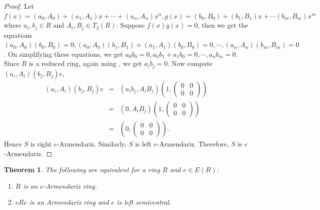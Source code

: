 \documentclass[12pt]{amsart}
\theoremstyle{plain}
\newtheorem{theorem}{Theorem}[section]
\theoremstyle{definition}
\theoremstyle{remark}
\numberwithin{equation}{section}
\begin{document}
\begin{proof}
	Let $f(x)=(a_0,A_0)+(a_1,A_1)x+\cdots+(a_n,A_n)x^n,g(x)=(b_0,B_0)+(b_1,B_1)x+\cdots(b_m,B_m)x^m$ where $a_i,b_j\in R$ and $A_i,B_j\in T_2(R)$. Suppose $f(x)g(x)=0$, then we get the equations $(a_0,A_0)(b_0,B_0)=0, (a_0,A_0)(b_1,B_1)+(a_1,A_1)(b_0,B_0)=0,\cdots,(a_n,A_n)(b_m,B_m)=0$. On simplifying these equations, we get $a_0b_0=0,a_0b_1+a_1b_0=0,\cdots,a_nb_m=0$. Since $R$ is a reduced ring, again using \cite[Lemma 1]{Armendariz}, we get $a_ib_j=0$. Now compute $(a_i,A_i)(b_j,B_j)e$,
	\begin{eqnarray*}
		(a_i,A_i)(b_j,B_j)e&=&(a_ib_j,A_iB_j)\left(1,\begin{pmatrix}
			0&0\\0&0
		\end{pmatrix}\right)\\
		&=&(0,A_iB_j)\left(1,\begin{pmatrix}
			0&0\\0&0
		\end{pmatrix}\right)\\
		&=&\left(0,\begin{pmatrix}
			0&0\\0&0
		\end{pmatrix}\right).
	\end{eqnarray*}
	Hence $S$ is right $e$-Armendariz. Similarly, $S$ is left $e$-Armendariz. Therefore, $S$ is $e$-Armendariz.
\end{proof}
\begin{theorem}
	The following are equivalent for a ring $R$ and $e\in E(R)$:
	\begin{enumerate}
		\item $R$ is an $e$-Armendariz ring.
		\item $eRe$ is an Armendariz ring and $e$ is left semicentral.
	\end{enumerate}
\end{theorem}
\end{document}
